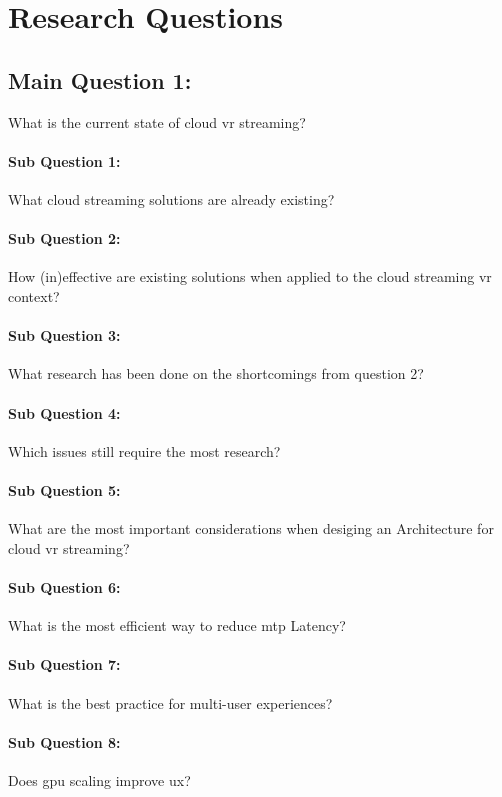 \section{Research Questions}

\subsection*{Main Question 1:} What is the current state of cloud \acrfull{vr} streaming?
\paragraph{Sub Question 1:} What cloud streaming solutions are already existing?
\paragraph{Sub Question 2:} How (in)effective are existing solutions when applied to the cloud streaming \acrshort{vr} context?
\paragraph{Sub Question 3:} What research has been done on the shortcomings from question 2?
\paragraph{Sub Question 4:} Which issues still require the most research?
\paragraph{Sub Question 5:} What are the most important considerations when desiging an Architecture for cloud \acrshort{vr} streaming?
\paragraph{Sub Question 6:} What is the most efficient way to reduce \acrfull{mtp} Latency?
\paragraph{Sub Question 7:} What is the best practice for multi-user experiences?
\paragraph{Sub Question 8:} Does \acrshort{gpu} scaling improve \acrfull{ux}?
